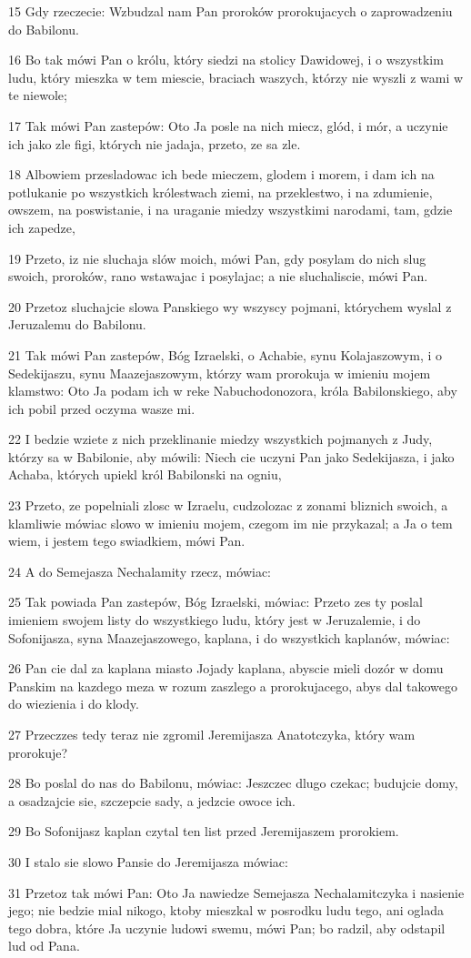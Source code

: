 \par 15 Gdy rzeczecie: Wzbudzal nam Pan proroków prorokujacych o zaprowadzeniu do Babilonu.
\par 16 Bo tak mówi Pan o królu, który siedzi na stolicy Dawidowej, i o wszystkim ludu, który mieszka w tem miescie, braciach waszych, którzy nie wyszli z wami w te niewole;
\par 17 Tak mówi Pan zastepów: Oto Ja posle na nich miecz, glód, i mór, a uczynie ich jako zle figi, których nie jadaja, przeto, ze sa zle.
\par 18 Albowiem przesladowac ich bede mieczem, glodem i morem, i dam ich na potlukanie po wszystkich królestwach ziemi, na przeklestwo, i na zdumienie, owszem, na poswistanie, i na uraganie miedzy wszystkimi narodami, tam, gdzie ich zapedze,
\par 19 Przeto, iz nie sluchaja slów moich, mówi Pan, gdy posylam do nich slug swoich, proroków, rano wstawajac i posylajac; a nie sluchaliscie, mówi Pan.
\par 20 Przetoz sluchajcie slowa Panskiego wy wszyscy pojmani, którychem wyslal z Jeruzalemu do Babilonu.
\par 21 Tak mówi Pan zastepów, Bóg Izraelski, o Achabie, synu Kolajaszowym, i o Sedekijaszu, synu Maazejaszowym, którzy wam prorokuja w imieniu mojem klamstwo: Oto Ja podam ich w reke Nabuchodonozora, króla Babilonskiego, aby ich pobil przed oczyma wasze mi.
\par 22 I bedzie wziete z nich przeklinanie miedzy wszystkich pojmanych z Judy, którzy sa w Babilonie, aby mówili: Niech cie uczyni Pan jako Sedekijasza, i jako Achaba, których upiekl król Babilonski na ogniu,
\par 23 Przeto, ze popelniali zlosc w Izraelu, cudzolozac z zonami bliznich swoich, a klamliwie mówiac slowo w imieniu mojem, czegom im nie przykazal; a Ja o tem wiem, i jestem tego swiadkiem, mówi Pan.
\par 24 A do Semejasza Nechalamity rzecz, mówiac:
\par 25 Tak powiada Pan zastepów, Bóg Izraelski, mówiac: Przeto zes ty poslal imieniem swojem listy do wszystkiego ludu, który jest w Jeruzalemie, i do Sofonijasza, syna Maazejaszowego, kaplana, i do wszystkich kaplanów, mówiac:
\par 26 Pan cie dal za kaplana miasto Jojady kaplana, abyscie mieli dozór w domu Panskim na kazdego meza w rozum zaszlego a prorokujacego, abys dal takowego do wiezienia i do klody.
\par 27 Przeczzes tedy teraz nie zgromil Jeremijasza Anatotczyka, który wam prorokuje?
\par 28 Bo poslal do nas do Babilonu, mówiac: Jeszczec dlugo czekac; budujcie domy, a osadzajcie sie, szczepcie sady, a jedzcie owoce ich.
\par 29 Bo Sofonijasz kaplan czytal ten list przed Jeremijaszem prorokiem.
\par 30 I stalo sie slowo Pansie do Jeremijasza mówiac:
\par 31 Przetoz tak mówi Pan: Oto Ja nawiedze Semejasza Nechalamitczyka i nasienie jego; nie bedzie mial nikogo, ktoby mieszkal w posrodku ludu tego, ani oglada tego dobra, które Ja uczynie ludowi swemu, mówi Pan; bo radzil, aby odstapil lud od Pana.

